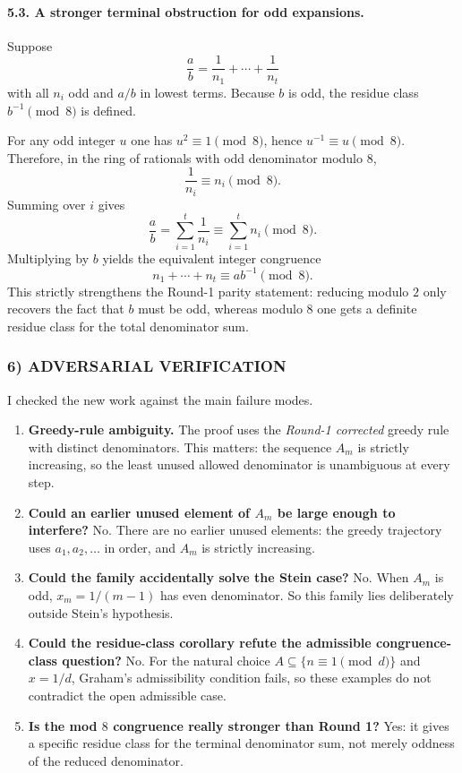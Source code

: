 \paragraph{5.3. A stronger terminal obstruction for odd expansions.}
Suppose
\[
\frac{a}{b}=\frac1{n_1}+\cdots+\frac1{n_t}
\]
with all $n_i$ odd and $a/b$ in lowest terms. Because $b$ is odd, the residue class $b^{-1}\pmod 8$ is defined.

For any odd integer $u$ one has $u^2\equiv 1\pmod 8$, hence $u^{-1}\equiv u\pmod 8$. Therefore, in the ring of rationals with odd denominator modulo $8$,
\[
 \frac1{n_i}\equiv n_i\pmod 8.
\]
Summing over $i$ gives
\[
 \frac{a}{b}=\sum_{i=1}^t \frac1{n_i}\equiv \sum_{i=1}^t n_i\pmod 8.
\]
Multiplying by $b$ yields the equivalent integer congruence
\[
 n_1+\cdots+n_t\equiv a b^{-1}\pmod 8.
\]
This strictly strengthens the Round-1 parity statement: reducing modulo $2$ only recovers the fact that $b$ must be odd, whereas modulo $8$ one gets a definite residue class for the total denominator sum.

\subsubsection*{6) ADVERSARIAL VERIFICATION}
I checked the new work against the main failure modes.
\begin{enumerate}
\item \textbf{Greedy-rule ambiguity.} The proof uses the \emph{Round-1 corrected} greedy rule with distinct denominators. This matters: the sequence $A_m$ is strictly increasing, so the least unused allowed denominator is unambiguous at every step.
\item \textbf{Could an earlier unused element of $A_m$ be large enough to interfere?} No. There are no earlier unused elements: the greedy trajectory uses $a_1,a_2,\dots$ in order, and $A_m$ is strictly increasing.
\item \textbf{Could the family accidentally solve the Stein case?} No. When $A_m$ is odd, $x_m=1/(m-1)$ has even denominator. So this family lies deliberately outside Stein's hypothesis.
\item \textbf{Could the residue-class corollary refute the admissible congruence-class question?} No. For the natural choice $A\subseteq\{n\equiv 1\pmod d\}$ and $x=1/d$, Graham's admissibility condition fails, so these examples do not contradict the open admissible case.
\item \textbf{Is the mod $8$ congruence really stronger than Round 1?} Yes: it gives a specific residue class for the terminal denominator sum, not merely oddness of the reduced denominator.
\end{enumerate}

